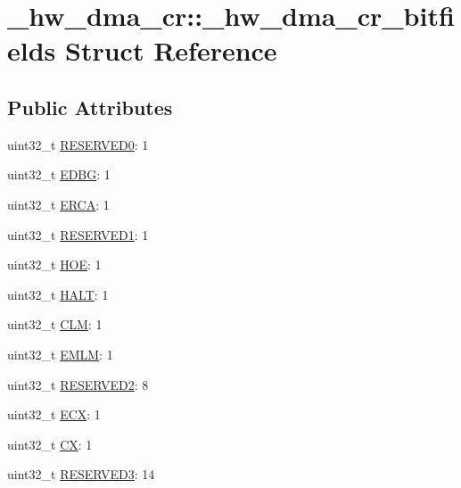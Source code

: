 \hypertarget{struct__hw__dma__cr_1_1__hw__dma__cr__bitfields}{}\section{\+\_\+hw\+\_\+dma\+\_\+cr\+:\+:\+\_\+hw\+\_\+dma\+\_\+cr\+\_\+bitfields Struct Reference}
\label{struct__hw__dma__cr_1_1__hw__dma__cr__bitfields}
\subsection*{Public Attributes}
\begin{DoxyCompactItemize}
\item 
uint32\+\_\+t \hyperlink{struct__hw__dma__cr_1_1__hw__dma__cr__bitfields_ac02eec3b12c3081f2c597a34faf7d765}{R\+E\+S\+E\+R\+V\+E\+D0}\+: 1
\item 
uint32\+\_\+t \hyperlink{struct__hw__dma__cr_1_1__hw__dma__cr__bitfields_a2b12f81c54ac2fa509103730bad39792}{E\+D\+BG}\+: 1
\item 
uint32\+\_\+t \hyperlink{struct__hw__dma__cr_1_1__hw__dma__cr__bitfields_a1cd269e7cb9d1cbd14ada2668f751b5b}{E\+R\+CA}\+: 1
\item 
uint32\+\_\+t \hyperlink{struct__hw__dma__cr_1_1__hw__dma__cr__bitfields_adcb569b382e70775391b99e2ce6bc0a5}{R\+E\+S\+E\+R\+V\+E\+D1}\+: 1
\item 
uint32\+\_\+t \hyperlink{struct__hw__dma__cr_1_1__hw__dma__cr__bitfields_a636143d83ae236d7ccac5f4aa71e293a}{H\+OE}\+: 1
\item 
uint32\+\_\+t \hyperlink{struct__hw__dma__cr_1_1__hw__dma__cr__bitfields_ad7a62260b01b485b2432a1ce314324b9}{H\+A\+LT}\+: 1
\item 
uint32\+\_\+t \hyperlink{struct__hw__dma__cr_1_1__hw__dma__cr__bitfields_a7a843d4503627285ae2637a5021c2697}{C\+LM}\+: 1
\item 
uint32\+\_\+t \hyperlink{struct__hw__dma__cr_1_1__hw__dma__cr__bitfields_a04aa1950659472aac64c292519bfb52e}{E\+M\+LM}\+: 1
\item 
uint32\+\_\+t \hyperlink{struct__hw__dma__cr_1_1__hw__dma__cr__bitfields_a7f2a79d70952baeb6de255b3ad85011a}{R\+E\+S\+E\+R\+V\+E\+D2}\+: 8
\item 
uint32\+\_\+t \hyperlink{struct__hw__dma__cr_1_1__hw__dma__cr__bitfields_aef15a24651da42f931310923f0728977}{E\+CX}\+: 1
\item 
uint32\+\_\+t \hyperlink{struct__hw__dma__cr_1_1__hw__dma__cr__bitfields_ab597df32881181a1800da2fa93116f3f}{CX}\+: 1
\item 
uint32\+\_\+t \hyperlink{struct__hw__dma__cr_1_1__hw__dma__cr__bitfields_a3e0dd703a5e877a26c24d5ce821a39c5}{R\+E\+S\+E\+R\+V\+E\+D3}\+: 14
\end{DoxyCompactItemize}


